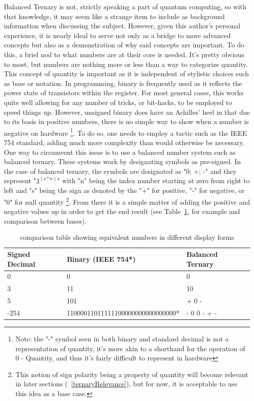 \documentclass[a4paper]{article}
\begin{document}
Balanced Ternary is not, strictly speaking a part of quantum computing, so with that knowledge, it may seem like a strange item to include as background information when discussing the subject. However, given this author's personal experience, it is nearly ideal to serve not only as a bridge to more advanced concepts but also as a demonstration of why said concepts are important. \newline
\newline
To do this, a brief nod to what numbers are at their core is needed. It's pretty obvious to most, but numbers are nothing more or less than a way to categorize quantity.  This concept of quantity is important as it is independent of stylistic choices such as base or notation.  In programming, binary is frequently used as it reflects the power state of transistors within the register.  For most general cases, this works quite well allowing for any number of tricks, or bit-hacks, to be employed to speed things up.  However, unsigned binary does have an Achilles' heel in that due to its basis in positive numbers, there is no simple way to show when a number is negative on hardware \footnote{Note: the "-" symbol seen in both binary and standard decimal is not a representation of quantity, it's more akin to a shorthand for the operation of 0 - Quantity, and thus it's fairly difficult to represent in hardware}.  To do so, one needs to employ a tactic such as the IEEE 754 standard, adding much more complexity than would otherwise be necessary.  One way to circumvent this issue is to use a balanced number system such as balanced ternary. \newline
\newline
These systems work by designating symbols as pre-signed.  In the case of balanced ternary, the symbols are designated as "0; +; -" and they represent "$3^{(s*n)}$" with "n" being the index number starting at zero from right to left and "s" being the sign as denoted by the "+" for positive, "-" for negative, or "0" for null quantity \footnote{ This notion of sign polarity being a property of quantity will become relevant in later sections (~\ref{ternaryRelevance}), but for now, it is acceptable to use this idea as a base case.}.  From there it is a simple matter of adding the positive and negative values up in order to get the end result (see Table~\ref{tab:ternary}, for example and comparison between bases).

\begin{table} %
	\centering
	\begin{tabular}{l|l|l} %
		Signed Decimal & Binary (IEEE 754*) & Balanced Ternary \\\hline %
		0 & 0 & 0 \\
		3 & 11 & 10 \\
		5 & 101 & + 0 - \\
		-254 & 11000011011111100000000000000000* & - 0 0 - + - \\ %
	\end{tabular}
	\caption{\label{tab:ternary}comparison table showing equivalent numbers in different display forms}
\end{table}
\end{document}
